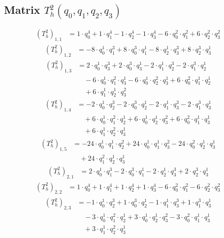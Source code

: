 \subsection{Matrix $T_{h}^2(q_0,q_1,q_2,q_3)$}
\begin{align*}(T_{h}^2)_{1,1}&=1\cdot q_0^{4}+1\cdot q_1^{4}-1\cdot q_2^{4}-1\cdot q_3^{4}-6\cdot q_0^{2}\cdot q_1^{2}+6\cdot q_2^{2}\cdot q_3^{2}\end{align*}
\begin{align*}(T_{h}^2)_{1,2}&=-8\cdot q_0^{1}\cdot q_1^{3}+8\cdot q_0^{3}\cdot q_1^{1}-8\cdot q_2^{1}\cdot q_3^{3}+8\cdot q_2^{3}\cdot q_3^{1}\end{align*}
\begin{align*}(T_{h}^2)_{1,3}&=2\cdot q_0^{1}\cdot q_3^{3}+2\cdot q_0^{3}\cdot q_3^{1}-2\cdot q_1^{1}\cdot q_2^{3}-2\cdot q_1^{3}\cdot q_2^{1}\\
&\quad -6\cdot q_0^{1}\cdot q_1^{2}\cdot q_3^{1}-6\cdot q_0^{1}\cdot q_2^{2}\cdot q_3^{1}+6\cdot q_0^{2}\cdot q_1^{1}\cdot q_2^{1}\\
&\quad +6\cdot q_1^{1}\cdot q_2^{1}\cdot q_3^{2}\end{align*}
\begin{align*}(T_{h}^2)_{1,4}&=-2\cdot q_0^{1}\cdot q_2^{3}-2\cdot q_0^{3}\cdot q_2^{1}-2\cdot q_1^{1}\cdot q_3^{3}-2\cdot q_1^{3}\cdot q_3^{1}\\
&\quad +6\cdot q_0^{1}\cdot q_1^{2}\cdot q_2^{1}+6\cdot q_0^{1}\cdot q_2^{1}\cdot q_3^{2}+6\cdot q_0^{2}\cdot q_1^{1}\cdot q_3^{1}\\
&\quad +6\cdot q_1^{1}\cdot q_2^{2}\cdot q_3^{1}\end{align*}
\begin{align*}(T_{h}^2)_{1,5}&=-24\cdot q_0^{1}\cdot q_1^{1}\cdot q_2^{2}+24\cdot q_0^{1}\cdot q_1^{1}\cdot q_3^{2}-24\cdot q_0^{2}\cdot q_2^{1}\cdot q_3^{1}\\
&\quad +24\cdot q_1^{2}\cdot q_2^{1}\cdot q_3^{1}\end{align*}
\begin{align*}(T_{h}^2)_{2,1}&=2\cdot q_0^{1}\cdot q_1^{3}-2\cdot q_0^{3}\cdot q_1^{1}-2\cdot q_2^{1}\cdot q_3^{3}+2\cdot q_2^{3}\cdot q_3^{1}\end{align*}
\begin{align*}(T_{h}^2)_{2,2}&=1\cdot q_0^{4}+1\cdot q_1^{4}+1\cdot q_2^{4}+1\cdot q_3^{4}-6\cdot q_0^{2}\cdot q_1^{2}-6\cdot q_2^{2}\cdot q_3^{2}\end{align*}
\begin{align*}(T_{h}^2)_{2,3}&=-1\cdot q_0^{1}\cdot q_2^{3}+1\cdot q_0^{3}\cdot q_2^{1}-1\cdot q_1^{1}\cdot q_3^{3}+1\cdot q_1^{3}\cdot q_3^{1}\\
&\quad -3\cdot q_0^{1}\cdot q_1^{2}\cdot q_2^{1}+3\cdot q_0^{1}\cdot q_2^{1}\cdot q_3^{2}-3\cdot q_0^{2}\cdot q_1^{1}\cdot q_3^{1}\\
&\quad +3\cdot q_1^{1}\cdot q_2^{2}\cdot q_3^{1}\end{align*}
